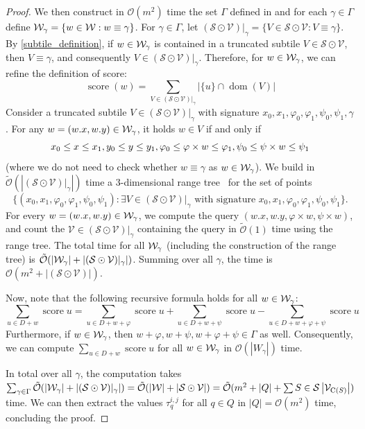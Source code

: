 \documentclass[11pt, letterpaper]{article}
\theoremstyle{plain}
\theoremstyle{definition}
\theoremstyle{remark}
\renewcommand{\O}{\mathcal{O}}
\newcommand{\tO}{\tilde{\mathcal{O}}}
\renewcommand{\S}{\mathcal{S}}
\newcommand{\V}{\mathcal{V}}
\renewcommand{\phi}{\varphi}
\DeclareMathOperator*{\score}{score}
\DeclareMathOperator*{\dom}{dom}
\newcommand{\absolute}[1]{\left\lvert#1\right\rvert}
\newcommand{\jonas}[2][]{\todo[color=green!40, #1]{\textbf{J:} #2}}
\begin{document}
\begin{proof}
We then construct in $\O(m^2)$ time the set $\Gamma$ defined in  and for each $\gamma \in \Gamma$ define $\mathcal{W}_\gamma = \{w \in \mathcal{W} : w \equiv \gamma\}$. For $\gamma \in \Gamma$, let $(\S \odot \V) |_\gamma = \{V \in \S \odot \V : V \equiv \gamma\}$. 
By \cref{subtile_definition}, if $w \in \mathcal{W}_\gamma$ is contained in a truncated subtile $V \in \S \odot \V$, then $V \equiv \gamma$, and consequently $V \in (\S \odot \V) |_\gamma$. Therefore, for $w \in \mathcal{W}_\gamma$, we can refine the definition of score:
%
$$\score(w) = \sum_{V \in (\S \odot \V) |_\gamma} \absolute{\{u\} \cap \dom(V)}$$
%
Consider a truncated subtile $V \in (\S \odot \V) |_\gamma$ with signature $x_0, x_1, \phi_0, \phi_1, \psi_0, \psi_1, \gamma$. For any $w = (w.x, w.y) \in \mathcal{W}_\gamma$, it holds $w \in V$ if and only if
\begin{equation}
\label{eq:range}
x_0 \le x \le x_1, y_0 \le y \le y_1, \phi_0 \le \h{w} \le \phi_1, \psi_0 \le \s{w} \le \psi_1
\end{equation}
(where we do not need to check whether $w \equiv \gamma$ as $w \in \mathcal{W}_\gamma$). We build in $\tO(\absolute{(\S \odot \V) |_\gamma})$ time a 3-dimensional range tree~\cite{BENTLEY1979244} for the set of points 
%
$$\{(x_0, x_1, \phi_0, \phi_1, \psi_0, \psi_1) : \exists V \in (\S \odot \V) |_\gamma\text{\ with signature\ } x_0, x_1, \phi_0, \phi_1, \psi_0, \psi_1\}.$$
For every $w = (w.x, w.y) \in \mathcal{W}_\gamma$, we compute the query $(w.x, w.y, \phi \times w, \psi \times w)$, and count the $\V \in (\S \odot \V) |_\gamma$ containing the query in $\tO(1)$ time using the range tree. The total time for all $\mathcal{W}_\gamma$ (including the construction of the range tree) is $\tO(\absolute{\W_\gamma} + \absolute{(\S \odot \V) |_\gamma})$. Summing over all $\gamma$, the time is $\O(m^2 + \absolute{(\S \odot \V)})$.

Now, note that the following recursive formula holds for all $w \in \mathcal{W}_\gamma$:\jonas{TODO}
%
$$\sum_{u \in D+w} \score{u} = \sum_{u \in D+w+\phi} \score{u} + \sum_{u \in D+w+\psi} \score{u} -\sum_{u \in D+w+\phi+\psi} \score{u}$$
%
Furthermore, if $w \in \mathcal{W}_\gamma$, then $w+\phi, w+\psi, w+\phi+\psi \in \Gamma$ as well. Consequently, we can compute $\sum_{u \in D+w} \score{u}$ for all $w \in \mathcal{W}_\gamma$ in $\O(\absolute{W_\gamma})$ time. 

In total over all $\gamma$, the computation takes $\sum_{\gamma \in \Gamma} \tO(\absolute{\W_\gamma} + \absolute{(\S \odot \V) |_\gamma}) = \tO(\absolute{\W} + \absolute{\S \odot \V}) = \tO(m^2 + \absolute{Q} + \sum{S \in \S} \absolute{\V_{\getchar{S}}})$ time. We can then extract the values $\tau^{i,j}_q$ for all $q \in Q$ in $\absolute{Q} = \O(m^2)$ time, concluding the proof. 
\end{proof}
	
\end{document}
